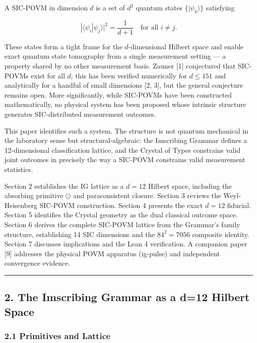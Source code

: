 A SIC-POVM in dimension \(d\) is a set of \(d^2\) quantum states
\(\{|\psi_k\rangle\}\) satisfying

\[|\langle \psi_i | \psi_j \rangle|^2 = \frac{1}{d+1} \quad \text{for all } i \neq j.\]

These states form a tight frame for the \(d\)-dimensional Hilbert space
and enable exact quantum state tomography from a single measurement
setting --- a property shared by no other measurement basis. Zauner
{[}1{]} conjectured that SIC-POVMs exist for all \(d\); this has been
verified numerically for \(d \leq 151\) and analytically for a handful
of small dimensions {[}2, 3{]}, but the general conjecture remains open.
More significantly, while SIC-POVMs have been constructed
mathematically, no physical system has been proposed whose intrinsic
structure generates SIC-distributed measurement outcomes.

This paper identifies such a system. The structure is not quantum
mechanical in the laboratory sense but structural-algebraic: the
Imscribing Grammar defines a 12-dimensional classification lattice, and
the Crystal of Types constrains valid joint outcomes in precisely the
way a SIC-POVM constrains valid measurement statistics.

Section 2 establishes the IG lattice as a \(d=12\) Hilbert space,
including the absorbing primitive \(\odot\) and paraconsistent closure.
Section 3 reviews the Weyl-Heisenberg SIC-POVM construction. Section 4
presents the exact \(d=12\) fiducial. Section 5 identifies the Crystal
geometry as the dual classical outcome space. Section 6 derives the
complete SIC-POVM lattice from the Grammar's family structure,
establishing 14 SIC dimensions and the \(84^2 = 7056\) composite
identity. Section 7 discusses implications and the Lean 4 verification.
A companion paper {[}9{]} addresses the physical POVM apparatus
(ig-pulse) and independent convergence evidence.

\begin{center}\rule{0.5\linewidth}{0.5pt}\end{center}

\hypertarget{the-imscribing-grammar-as-a-d12-hilbert-space}{%
\subsection{2. The Imscribing Grammar as a d=12 Hilbert
Space}\label{the-imscribing-grammar-as-a-d12-hilbert-space}}

\hypertarget{primitives-and-lattice}{%
\subsubsection{2.1 Primitives and
Lattice}\label{primitives-and-lattice}}

